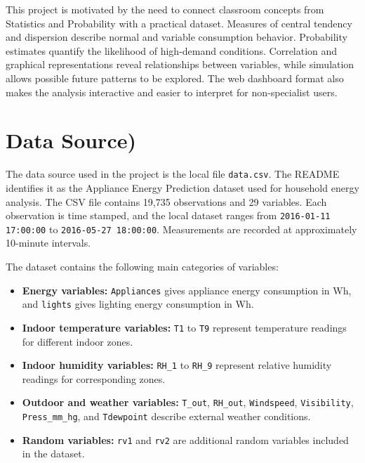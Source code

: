\documentclass[12pt,a4paper]{article}
\begin{document}
This project is motivated by the need to connect classroom concepts from Statistics and Probability with a practical dataset. Measures of central tendency and dispersion describe normal and variable consumption behavior. Probability estimates quantify the likelihood of high-demand conditions. Correlation and graphical representations reveal relationships between variables, while simulation allows possible future patterns to be explored. The web dashboard format also makes the analysis interactive and easier to interpret for non-specialist users.

\section{Data Source)}
\label{sec:data}

The data source used in the project is the local file \texttt{data.csv}. The README identifies it as the Appliance Energy Prediction dataset used for household energy analysis. The CSV file contains 19,735 observations and 29 variables. Each observation is time stamped, and the local dataset ranges from \texttt{2016-01-11 17:00:00} to \texttt{2016-05-27 18:00:00}. Measurements are recorded at approximately 10-minute intervals.

The dataset contains the following main categories of variables:

\begin{itemize}
\item \textbf{Energy variables:} \texttt{Appliances} gives appliance energy consumption in Wh, and \texttt{lights} gives lighting energy consumption in Wh.
\item \textbf{Indoor temperature variables:} \texttt{T1} to \texttt{T9} represent temperature readings for different indoor zones.
\item \textbf{Indoor humidity variables:} \texttt{RH\_1} to \texttt{RH\_9} represent relative humidity readings for corresponding zones.
\item \textbf{Outdoor and weather variables:} \texttt{T\_out}, \texttt{RH\_out}, \texttt{Windspeed}, \texttt{Visibility}, \texttt{Press\_mm\_hg}, and \texttt{Tdewpoint} describe external weather conditions.
\item \textbf{Random variables:} \texttt{rv1} and \texttt{rv2} are additional random variables included in the dataset.
\end{itemize}
\end{document}
